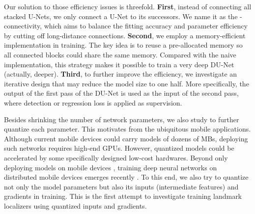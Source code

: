 \documentclass[runningheads]{llncs}
\begin{document}
Our solution to those efficiency issues is threefold. {\bf First}, instead of connecting all stacked U-Nets, we only connect a U-Net to its  successors. We name it as the - connectivity, which aims to balance the fitting accuracy and parameter efficiency by cutting off long-distance connections. {\bf Second}, we employ a memory-efficient implementation in training. The key idea is to reuse a pre-allocated memory so all connected blocks could share the same memory. Compared with the naive implementation, this strategy makes it possible to train a very deep DU-Net (actually,  deeper). {\bf Third}, to further improve the efficiency, we investigate an iterative design that may reduce the model size to one half. More specifically, the output of the first pass of the DU-Net is used as the input of the second pass, where detection or regression loss is applied as supervision. 

Besides shrinking the number of network parameters, we also study to further quantize each parameter. This motivates from the ubiquitous mobile applications. Although current mobile devices could carry models of dozens of MBs, deploying such networks requires high-end GPUs. However, quantized models could be accelerated by some specifically designed low-cost hardwares. Beyond only deploying models on mobile devices \cite{li2017deeprebirth}, training deep neural networks on distributed mobile devices emerges recently \cite{mcmahan2016communication}. To this end, we also try to quantize not only the model parameters but also its inputs (intermediate features) and gradients in training. This is the first attempt to investigate training landmark localizers using quantized inputs and gradients.
\end{document}

